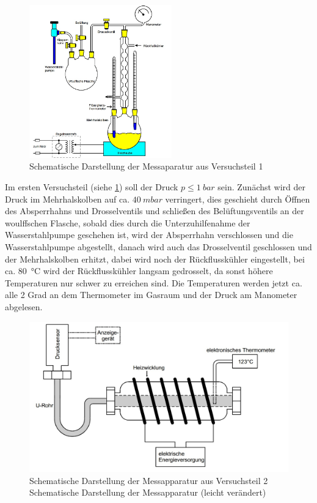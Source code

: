 
\begin{figure}
		\vspace{-1.2cm}
        \includegraphics[width=0.55\textwidth]{Grafiken/Abb3.jpg}
        \caption{Schematische Darstellung der Messaparatur aus Versuchsteil 1 \cite{V203}}
        \label{fig:Abb3}
\end{figure}

Im ersten Versuchsteil (siehe \cref{fig:Abb3}) soll der Druck $p \leq \SI{1}{bar}$ sein.
Zunächst wird der Druck im Mehrhalskolben auf ca. $\SI{40}{mbar}$ verringert, 
dies geschieht durch Öffnen des Absperrhahns und Drosselventils und schließen des Belüftungsventils 
an der woulffschen Flasche, sobald dies durch die Unterzuhilfenahme der Wasserstahlpumpe geschehen ist, 
wird der Absperrhahn verschlossen und die Wasserstahlpumpe abgestellt, danach wird auch das Drosselventil geschlossen 
und der Mehrhalskolben erhitzt, dabei wird noch der Rückflusskühler eingestellt, bei ca. \SI{80}{\celsius} wird
der Rückflusskühler langsam gedrosselt, da sonst höhere Temperaturen nur schwer zu erreichen sind.
Die Temperaturen werden jetzt ca. alle 2 Grad an dem Thermometer im Gasraum und der Druck am Manometer abgelesen.\\

\begin{figure}
       \includegraphics[scale=0.3]{Grafiken/Abb4.jpg}
        \caption{Schematische Darstellung der Messapparatur aus Versuchsteil 2 Schematische Darstellung der Messapparatur (leicht verändert)\cite{V203}}
        \label{fig:Abb4}
\end{figure}

